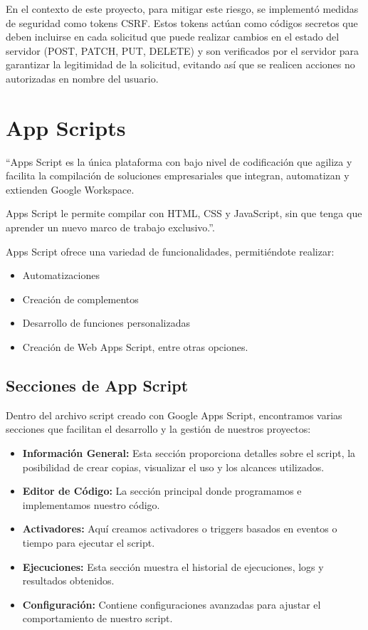 En el contexto de este proyecto, para mitigar este riesgo, se implementó medidas de seguridad como tokens CSRF. Estos tokens actúan como códigos secretos que deben incluirse en cada solicitud que puede realizar cambios en el estado del servidor (POST, PATCH, PUT, DELETE) y son verificados por el servidor para garantizar la legitimidad de la solicitud, evitando así que se realicen acciones no autorizadas en nombre del usuario.


\section{App Scripts}

``Apps Script es la única plataforma con bajo nivel de codificación que agiliza y facilita la compilación de soluciones empresariales que integran, automatizan y extienden Google Workspace.

Apps Script le permite compilar con HTML, CSS y JavaScript, sin que tenga que aprender un nuevo marco de trabajo exclusivo.''\cite{appscript}.

Apps Script ofrece una variedad de funcionalidades, permitiéndote realizar:

\begin{itemize}
\item Automatizaciones
\item Creación de complementos
\item Desarrollo de funciones personalizadas
\item Creación de Web Apps Script, entre otras opciones.
\end{itemize}

\subsection{Secciones de App Script}\label{sec:mt:app-script}

Dentro del archivo script creado con Google Apps Script, encontramos varias secciones que facilitan el desarrollo y la gestión de nuestros proyectos:

\begin{itemize}
\item \textbf{Información General:} Esta sección proporciona detalles sobre el script, la posibilidad de crear copias, visualizar el uso y los alcances utilizados.
\item \textbf{Editor de Código:} La sección principal donde programamos e implementamos nuestro código.

\item \textbf{Activadores:} Aquí creamos activadores o triggers basados en eventos o tiempo para ejecutar el script.

\item \textbf{Ejecuciones:} Esta sección muestra el historial de ejecuciones, logs y resultados obtenidos.

\item \textbf{Configuración:} Contiene configuraciones avanzadas para ajustar el comportamiento de nuestro script.
\end{itemize}


